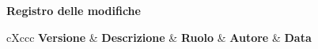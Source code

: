\newpage

\begin{center}
	\Large{\textbf{Registro delle modifiche}}
	\\\vspace{0.5cm}
	\normalsize
	\begin{paddedtablex}[1.3]{\textwidth}{cXccc}
		\textbf{Versione} & \textbf{Descrizione} & \textbf{Ruolo} & \textbf{Autore} & \textbf{Data} \\\toprule
		\modifiche
		\bottomrule
	\end{paddedtablex}
\end{center}

\newpage
